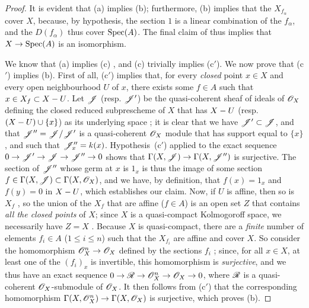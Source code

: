 \begin{proof}
It is evident that (a) implies (b); furthermore, (b) implies that the $X_{f_\alpha}$ cover $X$, because, by hypothesis, the section $1$ is a linear combination of the $f_\alpha$, and the $D(f_\alpha)$ thus cover $\operatorname{Spec}(A)$.
The final claim of  thus implies that $X\to\Spec(A)$ is an isomorphism.

We know that (a) implies (c) , and (c) trivially implies (c$'$).
We now prove that (c$'$) implies (b).
First of all, (c$'$) implies that, for every \emph{closed} point $x\in X$ and every open neighbourhood $U$ of $x$, there exists some $f\in A$ such that $x\in X_f\subset X- U$.
Let $\mathscr{J}$ (resp. $\mathscr{J}'$) be the quasi-coherent sheaf of ideals of $\mathscr{O}_X$ defining the closed reduced subprescheme of $X$ that has $X- U$ (resp. $(X- U)\cup\{x\}$) as its underlying space ;
it is clear that we have $\mathscr{J}'\subset\mathscr{J}$, and that $\mathscr{J}''=\mathscr{J}/\mathscr{J}'$ is a quasi-coherent $\mathscr{O}_X$ module that has support equal to $\{x\}$, and such that $\mathscr{J}_x''=k(x)$.
Hypothesis~(c$'$) applied to the exact sequence $0\to\sh{J}'\to\sh{J}\to\sh{J}''\to0$ shows that $\Gamma(X,\sh{J})\to\Gamma(X,\sh{J}'')$ is surjective.
The section of $\mathscr{J}''$ whose germ at $x$ is $1_x$ is thus the image of some section $f\in\Gamma(X,\mathscr{J})\subset\Gamma(X,\mathscr{O}_X)$, and we have, by definition, that $f(x)=1_x$ and $f(y)=0$ in $X- U$, which establishes our claim.
Now, if $U$ is affine, then so is $X_f$ , so the union of the $X_f$ that are affine ($f\in A$) is an open set $Z$ that contains \emph{all the closed points} of $X$;
since $X$ is a quasi-compact Kolmogoroff space, we necessarily have $Z=X$ .
Because $X$ is quasi-compact, there are a \emph{finite} number of elements $f_i\in A$ ($1\leq i\leq n$) such that the $X_{f_i}$ are affine and cover $X$.
So consider the homomorphism $\sh{O}_X^n\to\sh{O}_X$ defined by the sections $f_i$ ;
since, for all $x\in X$, at least one of the $(f_i)_x$ is invertible, this homomorphism is \emph{surjective}, and we thus have an exact sequence $0\to\sh{R}\to\sh{O}_X^n\to\sh{O}_X\to0$, where $\mathscr{R}$ is a quasi-coherent $\mathscr{O}_X$-submodule of $\mathscr{O}_X$.
It then follows
from (c$'$) that the corresponding homomorphism $\Gamma(X,\sh{O}_X^n)\to\Gamma(X,\sh{O}_X)$ is surjective, which proves (b).


\end{proof}
